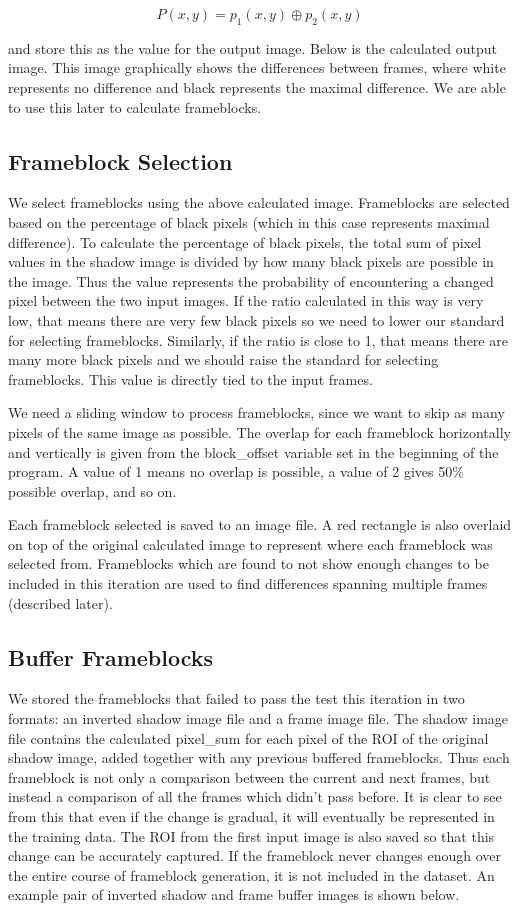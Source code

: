 \documentclass[conference]{IEEEtran}
\begin{document}
$$P(x,y) = p_1(x,y) \oplus p_2(x,y)$$

and store this as the value for the output image.
Below is the calculated output image.
This image graphically shows the differences between frames,
where white represents no difference and black represents the maximal difference.
We are able to use this later to calculate frameblocks.

\subsection{Frameblock Selection}
\label{subsec:frameblock_selection}
We select frameblocks using the above calculated image.
Frameblocks are selected based on the percentage of black pixels
(which in this case represents maximal difference).
To calculate the percentage of black pixels,
the total sum of pixel values in the shadow image is divided by how many black pixels are possible in the image.
Thus the value represents the probability of encountering a changed pixel between the two input images.
If the ratio calculated in this way is very low,
that means there are very few black pixels so we need to lower our standard for selecting frameblocks.
Similarly, if the ratio is close to 1,
that means there are many more black pixels and we should raise the standard for selecting frameblocks.
This value is directly tied to the input frames.

We need a sliding window to process frameblocks,
since we want to skip as many pixels of the same image as possible.
The overlap for each frameblock horizontally and vertically is given from the
block\_offset variable set in the beginning of the program.
A value of 1 means no overlap is possible,
a value of 2 gives 50\% possible overlap, and so on.

Each frameblock selected is saved to an image file.
A red rectangle is also overlaid on top of the original calculated image to represent where each frameblock was selected from.
Frameblocks which are found to not show enough changes to be included in this iteration are used to find differences spanning multiple frames (described later).

\subsection{Buffer Frameblocks}
\label{subsec:buffer_frameblocks}
We stored the frameblocks that failed to pass the test this iteration in two formats:
an inverted shadow image file and a frame image file.
The shadow image file contains the calculated pixel\_sum for each pixel of the ROI of the original shadow image,
added together with any previous buffered frameblocks.
Thus each frameblock is not only a comparison between the current and next frames,
but instead a comparison of all the frames which didn't pass before.
It is clear to see from this that even if the change is gradual,
it will eventually be represented in the training data.
The ROI from the first input image is also saved so that this change can be accurately captured.
If the frameblock never changes enough over the entire course of frameblock generation,
it is not included in the dataset.
An example pair of inverted shadow and frame buffer images is shown below.
\end{document}
